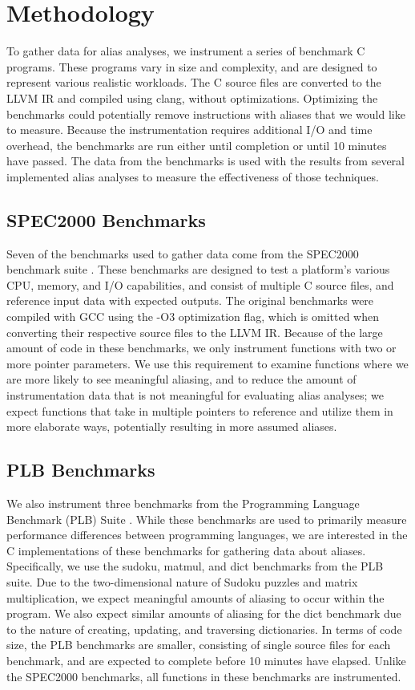 \chapter{Methodology}

To gather data for alias analyses, we instrument a series of benchmark C programs. These programs vary in size and complexity, and are designed to represent various realistic workloads. The C source files are converted to the LLVM IR and compiled using clang, without optimizations. Optimizing the benchmarks could potentially remove instructions with aliases that we would like to measure. Because the instrumentation requires additional I/O and time overhead, the benchmarks are run either until completion or until 10 minutes have passed. The data from the benchmarks is used with the results from several implemented alias analyses to measure the effectiveness of those techniques.

\section{SPEC2000 Benchmarks}
Seven of the benchmarks used to gather data come from the SPEC2000 benchmark suite \cite{spec2000}. These benchmarks are designed to test a platform's various CPU, memory, and I/O capabilities, and consist of multiple C source files, and reference input data with expected outputs. The original benchmarks were compiled with GCC using the -O3 optimization flag, which is omitted when converting their respective source files to the LLVM IR. Because of the large amount of code in these benchmarks, we only instrument functions with two or more pointer parameters. We use this requirement to examine functions where we are more likely to see meaningful aliasing, and to reduce the amount of instrumentation data that is not meaningful for evaluating alias analyses; we expect functions that take in multiple pointers to reference and utilize them in more elaborate ways, potentially resulting in more assumed aliases.

\section{PLB Benchmarks}
We also instrument three benchmarks from the Programming Language Benchmark (PLB) Suite \cite{plb}. While these benchmarks are used to primarily measure performance differences between programming languages, we are interested in the C implementations of these benchmarks for gathering data about aliases. Specifically, we use the sudoku, matmul, and dict benchmarks from the PLB suite. Due to the two-dimensional nature of Sudoku puzzles and matrix multiplication, we expect meaningful amounts of aliasing to occur within the program. We also expect similar amounts of aliasing for the dict benchmark due to the nature of creating, updating, and traversing dictionaries. In terms of code size, the PLB benchmarks are smaller, consisting of single source files for each benchmark, and are expected to complete before 10 minutes have elapsed. Unlike the SPEC2000 benchmarks, all functions in these benchmarks are instrumented.

